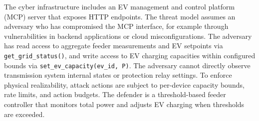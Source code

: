 The cyber infrastructure includes an EV management and control platform (MCP) server that exposes HTTP endpoints. The threat model assumes an adversary who has compromised the MCP interface, for example through vulnerabilities in backend applications or cloud misconfigurations. The adversary has read access to aggregate feeder measurements and EV setpoints via \texttt{get\_grid\_status()}, and write access to EV charging capacities within configured bounds via \texttt{set\_ev\_capacity(ev\_id, P)}. The adversary cannot directly observe transmission system internal states or protection relay settings. To enforce physical realizability, attack actions are subject to per-device capacity bounds, rate limits, and action budgets. The defender is a threshold-based feeder controller that monitors total power and adjusts EV charging when thresholds are exceeded.
